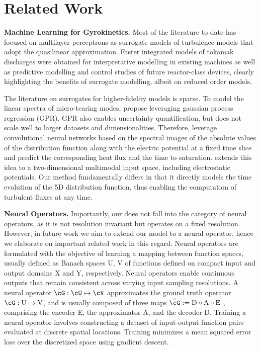 \section{Related Work}
\textbf{Machine Learning for Gyrokinetics.}
Most of the literature to date has focused on multilayer perceptrons as surrogate models of turbulence models that adopt the quasilinear approximation. 
Faster integrated models \citep{aJINTRAC-Romanelli, ASTRA}  of tokamak discharges were obtained for interpretative modelling in existing machines \citep{Meneghini2017, plassche2020} as well as predictive modelling \citep{Citrin_2023} and control studies \citep{VanMulders2021} of future reactor-class devices, clearly highlighting the benefits of surrogate modelling, albeit on reduced order models.

The literature on surrogates for higher-fidelity models is sparse. 
To model the linear spectra of micro-tearing modes, \citet{Hornsby2024} propose leveraging gaussian process regression (GPR).
GPR also enables uncertainty quantification, but does not scale well to larger datasets and dimensionalities.
Therefore, \citet{narita_toward_2022} leverage convolutional neural networks based on the spectral images of the absolute values of the distribution function along with the electric potential at a fixed time slice and predict the corresponding heat flux and the time to saturation. 
\citet{mitsuru_multimodal_2023} extends this idea to a two-dimensional multimodal input space, including electrostatic potentials.
Our method fundamentally differs in that it directly models the time evolution of the 5D distribution function, thus enabling the computation of turbulent fluxes at any time. 

\textbf{Neural Operators.} 
Importantly, our \ourmethod{} does not fall into the category of neural operators, as it is not resolution invariant but operates on a fixed resolution.
However, in future work we aim to extend our model to a neural operator, hence we elaborate on important related work in this regard.
Neural operators \citep{lu_learning_2021,li_neural_2020, kovachki_neural_2023,alkin_upt_2024} are formulated with the objective of learning a mapping between function spaces, usually defined as Banach spaces U, V of functions defined on compact input and output domains X and Y, respectively. 
Neural operators enable continuous outputs that remain consistent across varying input sampling resolutions. 
A neural operator $\hat{\cG} : \cU \mapsto \cV$ approximates the ground truth operator $\cG : \text{U} \mapsto \text{V}$, and is usually composed of three maps $\hat{\cG} := \text{D} \circ \text{A} \circ \text{E}$ \citep{seidman_nomad_2022}, comprising the encoder E, the approximator A, and the decoder D. 
Training a neural operator involves constructing a dataset of input-output function pairs evaluated at discrete spatial locations. 
Training minimizes a mean squared error loss over the discretized space using gradient descent.

